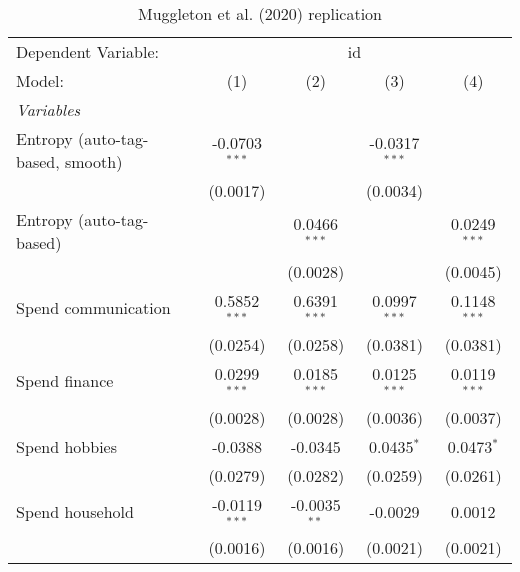 
\begin{table}[htbp]
   \centering
   \caption{\label{tab:muggleton2020_replication} Muggleton et al. (2020) replication}
   \begin{normalsize}
      \begin{tabular}{lcccc}
         \tabularnewline\midrule\midrule
         Dependent Variable: & \multicolumn{4}{c}{id}\\
         Model:                           & (1)                     & (2)                     & (3)             & (4)\\
         \midrule \emph{Variables} &   &   &   &  \\
         Entropy (auto-tag-based, smooth) & -0.0703$^{***}$         &                         & -0.0317$^{***}$ &   \\
                                          & (0.0017)                &                         & (0.0034)        &   \\
         Entropy (auto-tag-based)         &                         & 0.0466$^{***}$          &                 & 0.0249$^{***}$\\
                                          &                         & (0.0028)                &                 & (0.0045)\\
         Spend communication              & 0.5852$^{***}$          & 0.6391$^{***}$          & 0.0997$^{***}$  & 0.1148$^{***}$\\
                                          & (0.0254)                & (0.0258)                & (0.0381)        & (0.0381)\\
         Spend finance                    & 0.0299$^{***}$          & 0.0185$^{***}$          & 0.0125$^{***}$  & 0.0119$^{***}$\\
                                          & (0.0028)                & (0.0028)                & (0.0036)        & (0.0037)\\
         Spend hobbies                    & -0.0388                 & -0.0345                 & 0.0435$^{*}$    & 0.0473$^{*}$\\
                                          & (0.0279)                & (0.0282)                & (0.0259)        & (0.0261)\\
         Spend household                  & -0.0119$^{***}$         & -0.0035$^{**}$          & -0.0029         & 0.0012\\
                                          & (0.0016)                & (0.0016)                & (0.0021)        & (0.0021)\\

\end{tabular}
\end{normalsize}
\end{table}
